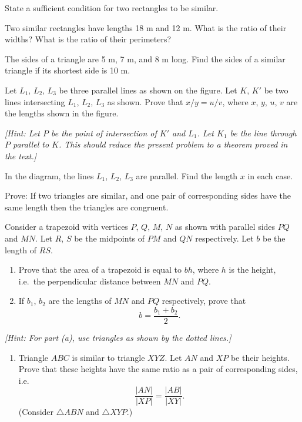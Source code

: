 \documentclass[12pt]{book} %
\begin{document}
\begin{ExerciseList}
\Exercise State a sufficient condition for two rectangles to be similar.

\Exercise Two similar rectangles have lengths 18 m and 12 m. What is the ratio of their widths? What is the ratio of their perimeters?

\Exercise The sides of a triangle are 5 m, 7 m, and 8 m long. Find the sides of a similar triangle if its shortest side is 10 m.

\Exercise Let $L_1$, $L_2$, $L_3$ be three parallel lines as shown on the figure. Let $K$, $K'$ be two lines intersecting $L_1$, $L_2$, $L_3$ as shown. Prove that $x/y=u/v$, where $x$, $y$, $u$, $v$ are the lengths shown in the figure.


\textit{[Hint: Let $P$ be the point of intersection of $K'$ and $L_1$. Let $K_1$ be the line through $P$ parallel to $K$. This should reduce the present problem to a theorem proved in the text.]}

\Exercise In the diagram, the lines $L_1$, $L_2$, $L_3$ are parallel. Find the length $x$ in each case.


\Exercise Prove: If two triangles are similar, and one pair of corresponding sides have the same length then the triangles are congruent.

\Exercise Consider a trapezoid with vertices $P$, $Q$, $M$, $N$ as shown with parallel sides $PQ$ and $MN$. Let $R$, $S$ be the midpoints of $PM$ and $QN$ respectively. Let $b$ be the length of $RS$.
\begin{enumerate}
\item[(a)] Prove that the area of a trapezoid is equal to $bh$, where $h$ is the height, i.e.\ the perpendicular distance between $MN$ and $PQ$.
\item[(b)] If $b_1$, $b_2$ are the lengths of $MN$ and $PQ$ respectively, prove that
\[
b=\frac{b_1+b_2}{2}.
\]
\end{enumerate}


\textit{[Hint: For part (a), use triangles as shown by the dotted lines.]}

\Exercise
\begin{enumerate}
\item[(a)] Triangle $ABC$ is similar to triangle $XYZ$. Let $AN$ and $XP$ be their heights. Prove that these heights have the same ratio as a pair of corresponding sides, i.e.
\[
\frac{|AN|}{|XP|}=\frac{|AB|}{|XY|}.
\]
(Consider $\triangle ABN$ and $\triangle XYP$.)


\end{enumerate}
\end{ExerciseList}
\end{document}
